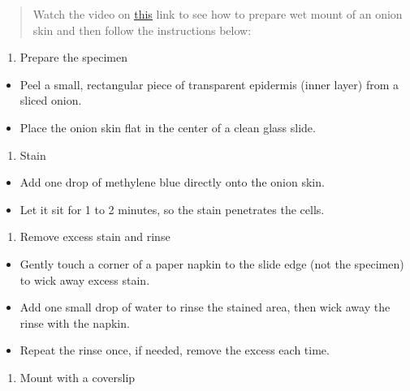 \documentclass[
  letterpaper,
  DIV=11,
  numbers=noendperiod]{scrreprt}
\providecommand{\tightlist}{%
  \setlength{\itemsep}{0pt}\setlength{\parskip}{0pt}}
\begin{document}
\begin{quote}
Watch the video on
\href{https://www.youtube.com/watch?v=6H92NLVMhss}{\ul{this}} link to
see how to prepare wet mount of an onion skin and then follow the
instructions below:
\end{quote}

\begin{enumerate}
\def\labelenumi{\arabic{enumi}.}
\tightlist
\item
  Prepare the specimen
\end{enumerate}

\begin{itemize}
\item
  Peel a small, rectangular piece of transparent epidermis (inner layer)
  from a sliced onion.
\item
  Place the onion skin flat in the center of a clean glass slide.
\end{itemize}

\begin{enumerate}
\def\labelenumi{\arabic{enumi}.}
\setcounter{enumi}{1}
\tightlist
\item
  Stain
\end{enumerate}

\begin{itemize}
\item
  Add one drop of methylene blue directly onto the onion skin.
\item
  Let it sit for 1 to 2 minutes, so the stain penetrates the cells.
\end{itemize}

\begin{enumerate}
\def\labelenumi{\arabic{enumi}.}
\setcounter{enumi}{2}
\tightlist
\item
  Remove excess stain and rinse
\end{enumerate}

\begin{itemize}
\item
  Gently touch a corner of a paper napkin to the slide edge (not the
  specimen) to wick away excess stain.
\item
  Add one small drop of water to rinse the stained area, then wick away
  the rinse with the napkin.
\item
  Repeat the rinse once, if needed, remove the excess each time.
\end{itemize}

\begin{enumerate}
\def\labelenumi{\arabic{enumi}.}
\setcounter{enumi}{3}
\tightlist
\item
  Mount with a coverslip
\end{enumerate}
\end{document}
